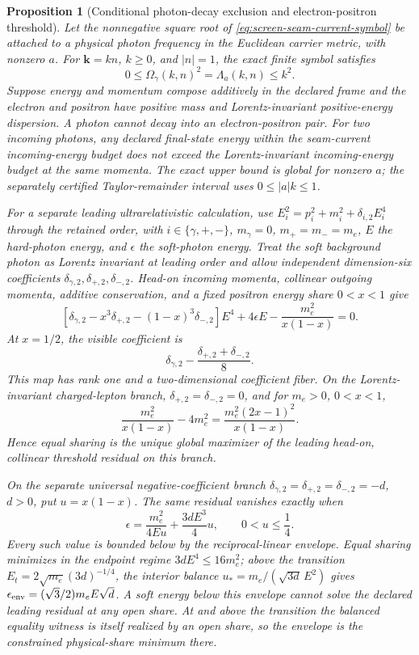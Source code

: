 \documentclass[11pt]{article}
\newtheorem{proposition}[theorem]{Proposition}
\theoremstyle{remark}
\theoremstyle{plain}
\begin{document}
\begin{proposition}[Conditional photon-decay exclusion and electron-positron threshold]
\label{prop:seam-current-photon-lepton-threshold}
Let the nonnegative square root of
\eqref{eq:screen-seam-current-symbol} be attached to a physical photon
frequency in the Euclidean carrier metric, with nonzero \(a\). For
\(\mathbf k=kn\), \(k\geq0\), and \(|n|=1\), the exact finite symbol satisfies
\[
0\leq\Omega_\gamma(k,n)^2=\Lambda_a(k,n)\leq k^2 .
\]
Suppose energy and momentum compose additively in the declared frame and the
electron and positron have positive mass and Lorentz-invariant positive-energy
dispersion. A photon cannot decay into an electron-positron pair. For two incoming photons,
any declared final-state energy within the seam-current incoming-energy budget
does not exceed the Lorentz-invariant incoming-energy budget at the same
momenta. The exact upper bound is global for nonzero \(a\); the separately
certified Taylor-remainder interval uses \(0\leq |a|k\leq1\).

For a separate leading ultrarelativistic calculation, use
\(E_i^2=p_i^2+m_i^2+\delta_{i,2}E_i^4\) through the retained order, with
\(i\in\{\gamma,+,-\}\), \(m_\gamma=0\), \(m_+=m_-=m_e\), \(E\) the
hard-photon energy, and \(\epsilon\) the soft-photon energy. Treat the
soft background photon as Lorentz invariant at leading order and allow
independent dimension-six coefficients
\(\delta_{\gamma,2},\delta_{+,2},\delta_{-,2}\). Head-on incoming momenta,
collinear outgoing momenta, additive conservation, and a fixed positron
energy share \(0<x<1\) give
\[
\left[\delta_{\gamma,2}-x^3\delta_{+,2}
 -(1-x)^3\delta_{-,2}\right]E^4
 +4\epsilon E-\frac{m_e^2}{x(1-x)}=0.
\]
At \(x=1/2\), the visible coefficient is
\[
\delta_{\gamma,2}
-\frac{\delta_{+,2}+\delta_{-,2}}8 .
\]
This map has rank one and a two-dimensional coefficient fiber. On the
Lorentz-invariant charged-lepton branch,
\(\delta_{+,2}=\delta_{-,2}=0\), and for \(m_e>0\), \(0<x<1\),
\[
\frac{m_e^2}{x(1-x)}-4m_e^2
=\frac{m_e^2(2x-1)^2}{x(1-x)}.
\]
Hence equal sharing is the unique global maximizer of the leading head-on,
collinear threshold residual on this branch.

On the separate universal negative-coefficient branch
\(\delta_{\gamma,2}=\delta_{+,2}=\delta_{-,2}=-d\), \(d>0\), put
\(u=x(1-x)\). The same residual vanishes exactly when
\[
 \epsilon=\frac{m_e^2}{4Eu}+\frac{3dE^3}{4}u,
 \qquad 0<u\leq\frac14.
\]
Every such value is bounded below by the reciprocal-linear envelope. Equal
sharing minimizes in the endpoint regime \(3dE^4\le16m_e^2\); above the
transition \(E_t=2\sqrt{m_e}(3d)^{-1/4}\), the interior balance
\(u_*=m_e/(\sqrt{3d}\,E^2)\) gives
\(\epsilon_{\rm env}=(\sqrt3/2)m_eE\sqrt d\). A soft energy below this
envelope cannot solve the declared leading residual at any open share. At and
above the transition the balanced equality witness is itself realized by an
open share, so the envelope is the constrained physical-share minimum there.
\end{proposition}
\end{document}
